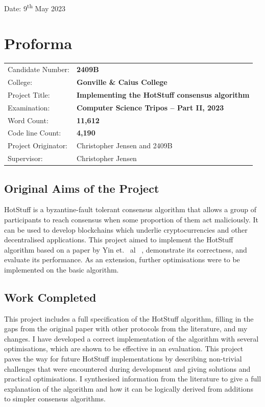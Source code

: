 \documentclass[12pt]{report}
\begin{document}
\noindent Date: 9\textsuperscript{th} May 2023

\chapter*{Proforma}

{\large
\begin{tabular}{ll}
Candidate Number:   & \bf 2409B \\
College:            & \bf Gonville \& Caius College                    \\
Project Title:      & \bf Implementing the HotStuff consensus algorithm \\
Examination:        & \bf Computer Science Tripos -- Part II, 2023  \\
Word Count:         & \bf 11,612\footnotemark[1] \\
Code line Count:    & \bf 4,190\footnotemark[2] \\
Project Originator: & Christopher Jensen and 2409B \\
Supervisor:         & Christopher Jensen \\ 
\end{tabular}
}

\section*{Original Aims of the Project}

HotStuff is a byzantine-fault tolerant consensus algorithm that allows a group of participants to reach consensus when some proportion of them act maliciously. It can be used to develop blockchains which underlie cryptocurrencies and other decentralised applications. This project aimed to implement the HotStuff algorithm based on a paper by Yin et. ~al~ \cite{yinHotStuffBFTConsensus2019}, demonstrate its correctness, and evaluate its performance. As an extension, further optimisations were to be implemented on the basic algorithm.


\section*{Work Completed}

This project includes a full specification of the HotStuff algorithm, filling in the gaps from the original paper with other protocols from the literature, and my changes. I have developed a correct implementation of the algorithm with several optimisations, which are shown to be effective in an evaluation. This project paves the way for future HotStuff implementations by describing non-trivial challenges that were encountered during development and giving solutions and practical optimisations. I synthesised information from the literature to give a full explanation of the algorithm and how it can be logically derived from additions to simpler consensus algorithms.
\end{document}
